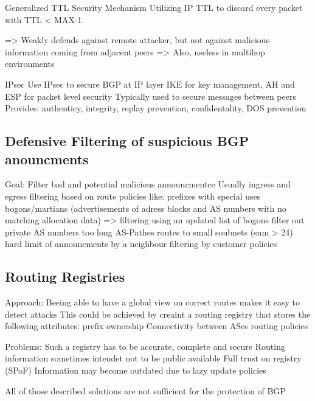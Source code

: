 \documentclass[12pt]{IEEEtran}
\begin{document}
			Generalized TTL Security Mechanism
				Utilizing IP TTL to discard every packet with TTL < MAX-1. 
				
				=> Weakly defends against remote attacker, but not against malicious information coming from adjacent peers
				=> Also, useless in multihop environments
				
			IPsec
				Use IPsec to secure BGP at IP layer 
				IKE for key management, AH and ESP for packet level security
				Typically used to secure messages between peers
				Provides: authenticy, integrity, replay prevention, confidentality, DOS prevention
			


       \subsection{Defensive Filtering of suspicious BGP anouncments}
	Goal: Filter bad and potential malicious announcmentce 
	Usually ingress and egress filtering based on route policies like:
			prefixes with special uses
			bogons/martians (advertisements of adress blocks and AS numbers with no matching allocation data)
				=> filtering using an updated list of bogons
			filter out private AS numbers
			too long AS-Pathes
			routes to small soubnets (snm > 24) 
			hard limit of announcments by a neighbour 
			filtering by customer policies
				

       \subsection{Routing Registries}
		Approach: Beeing able to have a global view on correct routes makes it easy to detect attacks
		This could be achieved by creaint a routing registry that stores the following attributes:
			prefix ownership
			Connectivity between ASes
			routing policies
			
		Problems: 
			Such a registry has to be accurate, complete and secure
			Routing information sometimes intendet not to be public available
			Full trust on registry (SPoF)
			Information may become outdated due to lazy update policies
       		
       
       
       		
       			
	All of those described solutions are not sufficient for the protection of BGP
\end{document}

